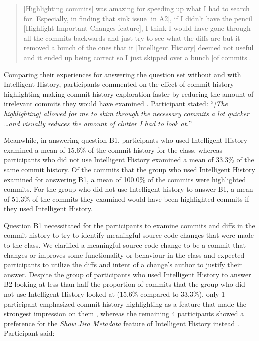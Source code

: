 \begin{quote}
  [Highlighting commits] was amazing for speeding up what I had to search for. 
  Especially, in finding that sink issue [in A2], if I didn’t have the pencil [Highlight Important Changes feature], 
  I think I would have gone through all the commits backwards and just try to see what the diffs are 
  but it removed a bunch of the ones that it [Intelligent History] deemed not useful and it ended up being correct so I just skipped over a bunch [of commits].
\end{quote}

Comparing their experiences for answering the question set without and with Intelligent History, 
participants commented on the effect of commit history highlighting making commit history exploration faster by reducing the amount of irrelevant commits they would have examined .
Participant  stated: ``\textit{[The highlighting] allowed for me to skim through the necessary commits a lot quicker \dots and visually reduces the amount of clutter I had to look at.}''

Meanwhile, in answering question B1, participants who used Intelligent History examined a mean of 15.6\% of the commit history for the  class,
whereas participants who did not use Intelligent History examined a mean of 33.3\% of the same commit history.
Of the commits that the group who used Intelligent History examined for answering B1, a mean of 100.0\% of the commits were highlighted commits.
For the group who did not use Intelligent history to answer B1, a mean of 51.3\% of the commits they examined would have been highlighted commits if they used Intelligent History.

Question B1 necessitated for the participants to examine commits and diffs in the  commit history to try to identify meaningful source code changes that were made to the class.
We clarified a meaningful source code change to be a commit that changes or improves some functionality or behaviour in the class and expected participants to utilize the diffs and intent of a change's author to justify their answer.
Despite the group of participants who used Intelligent History to answer B2 looking at less than half the proportion of commits that the group who did not use Intelligent History looked at (15.6\% compared to 33.3\%),
only 1 participant emphasized commit history highlighting as a feature that made the strongest impression on them , whereas the remaining 4 participants showed a preference for the \textit{Show Jira Metadata} feature of Intelligent History instead .
Participant  said:

